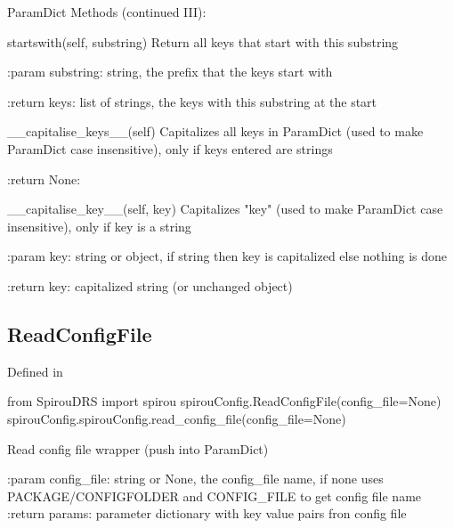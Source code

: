 \begin{minipage}{\textwidth}
\begin{pythondocstring}
ParamDict Methods (continued III):

	startswith(self, substring)
	        Return all keys that start with this substring

	        :param substring: string, the prefix that the keys start with

	        :return keys: list of strings, the keys with this substring at the start

	__capitalise_keys__(self)
	        Capitalizes all keys in ParamDict (used to make ParamDict case
	        insensitive), only if keys entered are strings

	        :return None:

	__capitalise_key__(self, key)
        Capitalizes "key" (used to make ParamDict case insensitive), only if
        key is a string

        :param key: string or object, if string then key is capitalized else
                    nothing is done

        :return key: capitalized string (or unchanged object)

\end{pythondocstring}
\end{minipage}

\begin{minipage}{\textwidth}
\subsection{ReadConfigFile}

Defined in \spirouConfig{}

\begin{pythonbox}
from SpirouDRS import spirou
spirouConfig.ReadConfigFile(config_file=None)
spirouConfig.spirouConfig.read_config_file(config_file=None)
\end{pythonbox}

\begin{pythondocstring}
Read config file wrapper (push into ParamDict)

:param config_file: string or None, the config_file name, if none uses
                    PACKAGE/CONFIGFOLDER and CONFIG_FILE to get config
                    file name
:return params: parameter dictionary with key value pairs fron config file
\end{pythondocstring}
\end{minipage}

